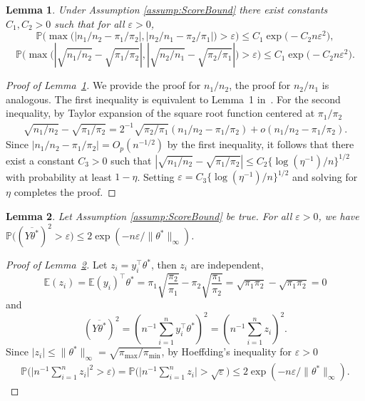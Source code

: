 \documentclass[twoside, onecolumn]{article}
\def\E{\mathbb{E}}
\def\varep{\varepsilon}
\newtheorem{lemma}{Lemma}
\begin{document}
\begin{lemma}\label{lem:OptScoreSupNormBound}
Under Assumption \ref{assump:ScoreBound} there exist constants $C_1, C_2>0$ such that for all $\varep>0$,
$$
\mathbb{P}\bigg(\max\Big(|n_1/n_2-\pi_1/\pi_2|,|n_2/n_1-\pi_2/\pi_1|\Big)>\varep\bigg)\leq C_1 \exp\Big(- C_2 n \varepsilon^2 \Big),
$$
$$
\mathbb{P}\bigg(\max\Big(|\sqrt{n_1/n_2}-\sqrt{\pi_1/\pi_2}|,|\sqrt{n_2/n_1}-\sqrt{\pi_2/\pi_1}|\Big)>\varep\bigg)\leq C_1 \exp\Big(- C_2 n \varepsilon^2 \Big).
$$

\end{lemma}
\begin{proof}[Proof of Lemma~\ref{lem:OptScoreSupNormBound}]
We provide the proof for $n_1/n_2$, the proof for $n_2/n_1$ is analogous. The first inequality is equivalent to Lemma~1 in~\cite{gaynanova2017sparse}. For the second inequality, by Taylor expansion of the square root function
centered at $\pi_{1}/\pi_{2}$
\begin{align*}
    \sqrt{n_1/n_2} - \sqrt{\pi_1/\pi_2} = 2^{-1}\sqrt{\pi_2/\pi_1}(n_1/n_2-\pi_1/\pi_2) + o(n_1/n_2-\pi_1/\pi_2).
\end{align*}
Since $|n_1/n_2-\pi_1/\pi_2|= O_p(n^{-1/2})$ by the first inequality, it follows that there exist a constant $C_3>0$ such that $|\sqrt{n_1/n_2} - \sqrt{\pi_1/\pi_2}|\leq C_2\{\log(\eta^{-1})/n\}^{1/2}$ with probability at least $1-\eta$. Setting $\varep=C_3\{\log(\eta^{-1})/n\}^{1/2}$ and solving for $\eta$ completes the proof. 
\end{proof}

\begin{lemma}\label{lem:ytheta} Let Assumption \ref{assump:ScoreBound} be true. For all $\varep>0$, we have $\mathbb{P}\big((\overline{Y\theta^*})^2>\varep \big)\leq  2 \exp(- n \varepsilon/\|\theta^*\|_\infty)$.
\end{lemma}
\begin{proof}[Proof of Lemma~\ref{lem:ytheta}]
Let $z_i=y_i^{\top}\theta^*$, then $z_i$ are independent,
$$
\E(z_i) = \E(y_i)^{\top}\theta^* =
\pi_1\sqrt{\frac{\pi_2}{\pi_1}} -\pi_2\sqrt{\frac{\pi_1}{\pi_2}}=
\sqrt{\pi_1 \pi_2}-\sqrt{\pi_1 \pi_2}=0
$$
and
$$
(\overline{Y\theta^*})^2 = (n^{-1}\sum_{i=1}^ny_i^{\top}\theta^*)^2=(n^{-1}\sum_{i=1}^nz_i)^2.
$$
Since $|z_i|\leq \|\theta^*\|_{\infty}=\sqrt{\pi_{\max}/\pi_{\min}}$, by Hoeffding's inequality for $\varepsilon >0$ 
\begin{align*}
\mathbb{P}\Big(\Big|n^{-1}\sum_{i=1}^nz_i\Big|^2>\varepsilon\Big) = \mathbb{P}\Big(\Big|n^{-1}\sum_{i=1}^nz_i\Big|>\sqrt{\varepsilon}\Big)\leq 2\exp(-n \varepsilon/\|\theta^\ast\|_\infty).
\end{align*}
\end{proof}
\end{document}
